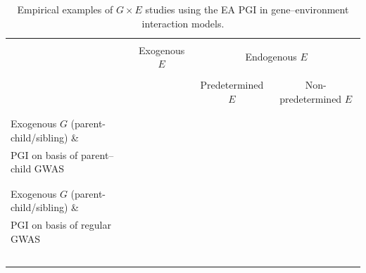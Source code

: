 \documentclass[12pt,a4paper]{article}
\begin{document}
\begin{bibunit}
\begin{landscape}
\begin{table}[H] \caption{Empirical examples of $G \times E$ studies using the EA PGI in gene--environment interaction models.} \label{tab:Examples}
\centering
{\scriptsize
\begin{tabular}{llll} 
\hline \hline \\
& \multicolumn{1}{c}{Exogenous $E$} & \multicolumn{2}{c}{Endogenous $E$} \\ 
\cmidrule(lr){2-2}\cmidrule(lr){3-4} \\
& \multicolumn{1}{c}{} & \multicolumn{1}{c}{Predetermined $E$} & \multicolumn{1}{c}{Non-predetermined $E$} \\ 
\\
\hline
& & & \\

Exogenous $G$ (parent-child/sibling) \&       &  &  \\
\indent\hspace{0.3cm} PGI on basis of parent--child GWAS       &         &  & \\
 &   &   &  \\

\hline
&&&\\

Exogenous $G$ (parent-child/sibling) \&        & \citet[][Birth order]{Muslimova2020b} & \citet[][Family circumstances]{Bates2018} & \citet[][Social context]{cheesman2022genes} \\
\indent\hspace{0.3cm} PGI on basis of regular GWAS  &  \citet[][Education system]{Barcellos2021}  & \citet[][Family circumstances]{Domingue2015a}  &  \\
& \citet[][Vaccination campaign]{berg2023early} &  \citet[][Family circumstances]{houmark2022genetic}&\\
& & \citet[][Family circumstances]{ronda2022family} &\\
& & \citet[][Cohort/Family circumstances]{pettersson2023genetic} &\\
&&& \\
\hline
& & & \\


\end{tabular}}
\end{table}
\end{landscape}
\end{bibunit}
\end{document}
